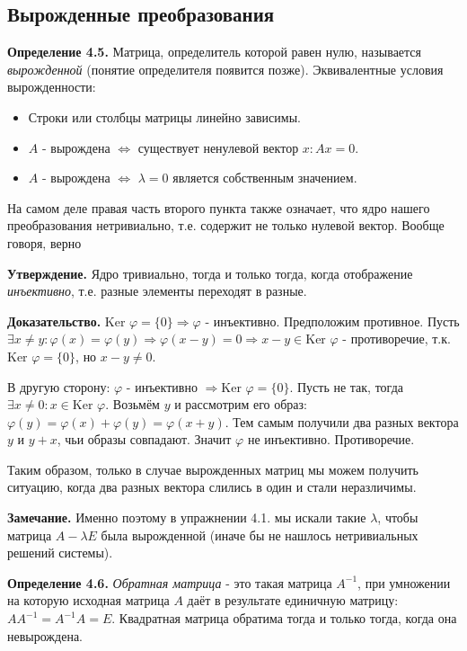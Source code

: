 \documentclass[a4paper, 12pt]{article}
\begin{document}
\begin{spacing}{1.5}
 
\setlength{\leftskip}{0ex}
\setlength{\rightskip}{0ex}


\subsection*{Вырожденные преобразования}

\textbf{Определение 4.5.} Матрица, определитель которой равен нулю, называется \textit{вырожденной} (понятие определителя появится позже). Эквивалентные условия вырожденности:
\begin{itemize} [noitemsep] 
    \item Строки или столбцы матрицы линейно зависимы.
    \item $A$ - вырождена $\Leftrightarrow$ существует ненулевой вектор $x: Ax = 0$.
    \item $A$ - вырождена $\Leftrightarrow$ $\lambda = 0$ является собственным значением.
\end{itemize}
На самом деле правая часть второго пункта также означает, что ядро нашего преобразования нетривиально, т.е. содержит не только нулевой вектор. Вообще говоря, верно

\textbf{Утверждение.} Ядро тривиально, тогда и только тогда, когда отображение \textit{инъективно}, т.е. разные элементы переходят в разные. 

\textbf{Доказательство.} Ker $\varphi = \{0\} \Rightarrow \varphi$ - инъективно. Предположим противное. Пусть $\exists x \neq y: \varphi(x) = \varphi(y) \Rightarrow \varphi(x-y) = 0 \Rightarrow x-y \in \text{Ker } \varphi$ - противоречие, т.к. $\text{Ker } \varphi = \{ 0\}$, но $x - y \neq 0$.

В другую сторону: $\varphi$ - инъективно $\Rightarrow \text{Ker } \varphi = \{0\}$. Пусть не так, тогда $\exists x \neq 0: x \in \text{Ker } \varphi$. Возьмём $y$ и рассмотрим его образ: $\varphi(y) = \varphi(x) + \varphi(y) = \varphi(x + y)$. Тем самым получили два разных вектора $y$ и $y+x$, чьи образы совпадают. Значит $\varphi$ не инъективно. Противоречие.

Таким образом, только в случае вырожденных матриц мы можем получить ситуацию, когда два разных вектора слились в один и стали неразличимы.

\textbf{Замечание.} Именно поэтому в упражнении 4.1. мы искали такие $\lambda$, чтобы матрица $A - \lambda E$ была вырожденной (иначе бы не нашлось нетривиальных решений системы).

\textbf{Определение 4.6.} \textit{Обратная матрица} - это такая матрица $A^{-1}$, при умножении на которую исходная матрица $A$ даёт в результате единичную матрицу: $AA^{-1} = A^{-1}A = E$. Квадратная матрица обратима тогда и только тогда, когда она невырождена.


\end{spacing}
\end{document}
